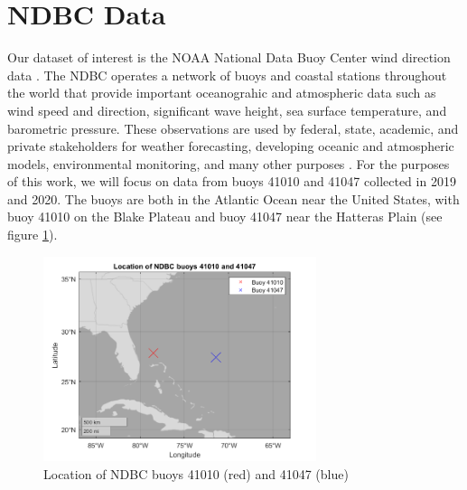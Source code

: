\documentclass[12pt]{article}
\numberwithin{equation}{section}
\numberwithin{figure}{section}
\begin{document}
%


\section{NDBC Data}

Our dataset of interest is the NOAA National Data Buoy Center wind direction data \cite{NDBC}. The NDBC operates a network of buoys and coastal stations throughout the world that provide important oceanograhic and atmospheric data such as wind speed and direction, significant wave height, sea surface temperature, and barometric pressure. These observations are used by federal, state, academic, and private stakeholders for weather forecasting, developing oceanic and atmospheric models, environmental monitoring, and many other purposes \cite{NDBCdoc}. For the purposes of this work, we will focus on data from buoys 41010 and 41047 collected in 2019 and 2020. The buoys are both in the Atlantic Ocean near the United States, with buoy 41010 on the Blake Plateau and buoy 41047 near the Hatteras Plain (see figure \ref{fig:buoys}). 

\begin{figure}[h]
\centering
\includegraphics[width=80mm]{New Folder/buoy locations.png}
\caption{Location of NDBC buoys 41010 (red) and 41047 (blue)}\label{fig:buoys}
\end{figure}
\end{document}
